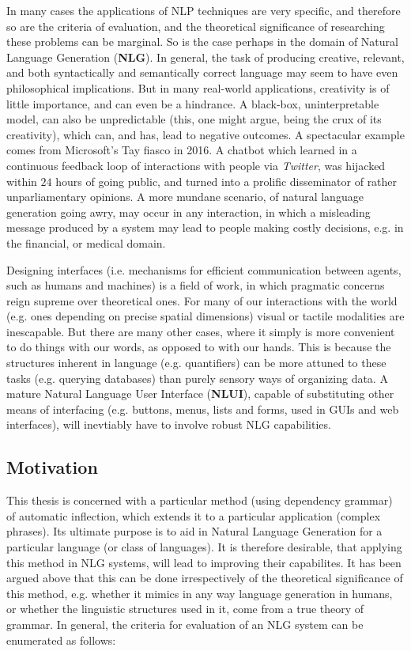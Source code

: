 \documentclass[12pt]{article}
\begin{document}
In many cases the applications of NLP techniques are very specific, and therefore so are the criteria of evaluation, and the theoretical significance of researching these problems can be marginal. So is the case perhaps in the domain of Natural Language Generation (\textbf{NLG}). In general, the task of producing creative, relevant, and both syntactically and semantically correct language may seem to have even philosophical implications. But in many real-world applications, creativity is of little importance, and can even be a hindrance. A black-box, uninterpretable model, can also be unpredictable (this, one might argue, being the crux of its creativity), which can, and has, lead to negative outcomes. A spectacular example comes from Microsoft's Tay fiasco in 2016. A chatbot which learned in a continuous feedback loop of interactions with people via \textit{Twitter}, was hijacked within $24$ hours of going public, and turned into a prolific disseminator of rather unparliamentary opinions. A more mundane scenario, of natural language generation going awry, may occur in any interaction, in which a misleading message produced by a system may lead to people making costly decisions, e.g. in the financial, or medical domain.

Designing interfaces (i.e. mechanisms for efficient communication between agents, such as humans and machines) is a field of work, in which pragmatic concerns reign supreme over theoretical ones. For many of our interactions with the world (e.g. ones depending on precise spatial dimensions) visual or tactile modalities are inescapable. But there are many other cases, where it simply is more convenient to do things with our words, as opposed to with our hands. This is because the structures inherent in language (e.g. quantifiers) can be more attuned to these tasks (e.g. querying databases) than purely sensory ways of organizing data. A mature Natural Language User Interface (\textbf{NLUI}), capable of substituting other means of interfacing (e.g. buttons, menus, lists and forms, used in GUIs and web interfaces), will inevtiably have to involve robust NLG capabilities.

\subsection{Motivation}
\label{sec:motivation}
This thesis is concerned with a particular method (using dependency grammar) of automatic inflection, which extends it to a particular application (complex phrases). Its ultimate purpose is to aid in Natural Language Generation for a particular language (or class of languages). It is therefore desirable, that applying this method in NLG systems, will lead to improving their capabilites. It has been argued above that this can be done irrespectively of the theoretical significance of this method, e.g. whether it mimics in any way language generation in humans, or whether the linguistic structures used in it, come from a true theory of grammar. In general, the criteria for evaluation of an NLG system can be enumerated as follows:
\end{document}
